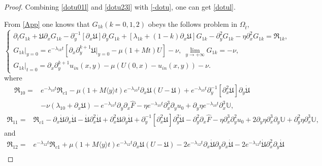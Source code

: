 \documentclass{amsart}
\numberwithin{equation}{section}
\newcommand\y{{{\langle y \rangle}}}
\begin{document}
\begin{proof}
Combining \eqref{dotu01l} and \eqref{dotu23l} with \eqref{-dotu}, one can get \eqref{dotul}.

From \eqref{App} one knows that $G_{1k}(k=0,1,2)$ obeys the follows problem in $\Omega_{\hat{t}}$,
\begin{equation*}
\begin{cases}
\partial_{t}G_{1k}
+\mathfrak{U}\partial_{x}G_{1k}
-\partial_{y}^{-1}[\partial_{x}\mathfrak{U}]\partial_{y}G_{1k}
+[\lambda_{1k}+(1-k)\partial_{x}\mathfrak{U}]G_{1k}
-\partial_{y}^{2}G_{1k}
-\eta\partial_{x}^{2}G_{1k}
=\mathfrak{R}_{1k},\\
G_{1k}|_{y=0}=e^{-\lambda_{1k}t}\left[\partial_{x}\partial_{y}^{k+1}\mathfrak{U}|_{y=0}-\mu(1+Mt)U\right]-\nu,~
\lim\limits_{y\to+\infty}G_{1k}=-\nu,\\
G_{1k}|_{t=0}=\partial_{x}\partial_{y}^{k+1}u_{in}(x,y)-\mu(U(0,x)-u_{in}(x,y))-\nu.
\end{cases}
\end{equation*}
where
\begin{align*}
\mathfrak{R}_{10}
=& e^{-\lambda_{10}t}\mathfrak{R}_{c1}
  -\mu(1+M\y t)e^{-\lambda_{10}t}\partial_{x}\mathfrak{U}(U-\mathfrak{U})
  +e^{-\lambda_{10}t}\partial_{y}^{-1}[\partial_{x}^{2}\mathfrak{U}]\partial_{y}\dot{\mathfrak{U}}\\
 &-\nu(\lambda_{10}+\partial_{x}\mathfrak{U})
  -e^{-\lambda_{10}t}\partial_{y}\partial_{x}\hat{F}
  -\eta e^{-\lambda_{10}t}\partial_{x}^{3}\partial_{y}u_{0}
  +\partial_{y}\eta e^{-\lambda_{10}t}\partial_{x}^{3}\mathbb{U},
\end{align*}
\begin{align*}
\mathfrak{R}_{11}
=& \mathfrak{R}_{c1}
  -\partial_{x}\dot{\mathfrak{U}}\partial_{x}\dot{\mathfrak{U}}
  -\dot{\mathfrak{U}}\partial_{x}^{2}\dot{\mathfrak{U}}
  +\partial_{x}^{2}\mathfrak{U}\partial_{y}\dot{\mathfrak{U}}
  +\partial_{y}^{-1}[\partial_{x}^{2}\mathfrak{U}]\partial_{y}^{2}\dot{\mathfrak{U}}
  -\partial_{y}^{2}\partial_{x}\hat{F}
  -\eta\partial_{x}^{3}\partial_{y}^{2}u_{0}
  +2\partial_{y}\eta\partial_{x}^{3}\partial_{y}\mathbb{U}
  +\partial_{y}^{2}\eta\partial_{x}^{3}\mathbb{U},
\end{align*}
and
\begin{align*}
\mathfrak{R}_{12}
=& e^{-\lambda_{12}t}\mathfrak{R}_{c1}
  +\mu(1+M\y t)e^{-\lambda_{12}t}\partial_{x}\mathfrak{U}(U-\mathfrak{U})
  -2e^{-\lambda_{12}t}\partial_{x}\dot{\mathfrak{U}}\partial_{y}\partial_{x}\dot{\mathfrak{U}}
  -2e^{-\lambda_{12}t}\dot{\mathfrak{U}}\partial_{x}^{2}\partial_{y}\dot{\mathfrak{U}}\\

\end{align*}
\end{proof}
\end{document}
